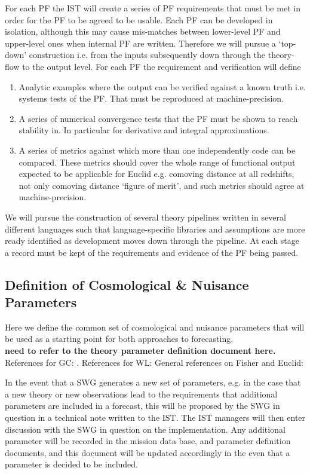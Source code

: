 For each PF the IST will create a series of PF requirements that must be met in order for the PF to be agreed to be 
usable. Each PF can be developed in isolation, although this may cause mis-matches between lower-level PF and 
upper-level ones when internal PF are written. Therefore we will pursue a `top-down' construction i.e. from the 
inputs subsequently down through the theory-flow to the output level. 
For each PF the requirement and verification will define 
\begin{enumerate} 
\item 
Analytic examples where the output can be verified against a known truth i.e. systems tests of the PF. That must be
reproduced at machine-precision. 
\item 
A series of numerical convergence tests that the PF must be shown to reach stability in. In particular for 
derivative and integral approximations. 
\item 
A series of metrics against which more than one independently code can be compared. These metrics should cover 
the whole range of functional output expected to be applicable for Euclid e.g. comoving distance at all redshifts, 
not only comoving distance `figure of merit', and such metrics should agree at machine-precision. 
\end{enumerate} 
We will pursue the construction of several theory pipelines written in several different languages such that 
language-specific libraries and assumptions are more ready identified as development moves down through the pipeline. 
At each stage a record must be kept of the requirements and evidence of the PF being passed. 

\subsection{Definition of Cosmological \& Nuisance Parameters} 
Here we define the common set of cosmological and nuisance parameters that will be used as a starting point for 
both approaches to forecasting. 
\\
{\bf need to refer to the theory parameter definition document here.}
\\
References for GC: \cite{2003ApJ...598..720S}. References for WL: \cite{2006ApJ...636...21M}
General references on Fisher and Euclid: \cite{Amendola2010a, Euclid_TWG}

In the event that a SWG generates a new set of parameters, e.g. in the case that a new theory or new observations lead to the 
requirements that additional parameters are included in a forecast, this will be proposed by the SWG in question in a technical note 
written to the IST. The IST managers will then enter discussion with the SWG in question on 
the implementation. Any additional parameter will 
be recorded in the mission data base, and parameter definition documents, and this document will be updated accordingly in the even that 
a parameter is decided to be included. 

